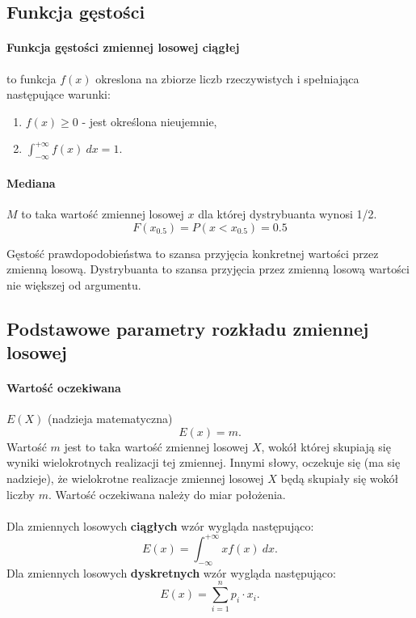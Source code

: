 \documentclass[]{report}
\begin{document}
\subsection{Funkcja gęstości}

\paragraph{Funkcja gęstości zmiennej losowej ciągłej} to funkcja $f(x)$ okreslona na zbiorze liczb rzeczywistych i spełniająca następujące warunki:

\begin{enumerate}
\item $f(x) \ge 0$ - jest określona nieujemnie,
\item $ \int_{-\infty}^{+ \infty} f(x)~dx = 1$.
\end{enumerate}

\paragraph{Mediana} $M$ to taka wartość zmiennej losowej $x$ dla której dystrybuanta wynosi 1/2.
\begin{equation}
F(x_{0.5}) = P(x < x_{0.5}) = 0.5
\end{equation}


Gęstość prawdopodobieństwa to szansa przyjęcia konkretnej wartości
przez zmienną losową. Dystrybuanta to szansa przyjęcia przez zmienną
losową wartości nie większej od argumentu.

\subsection{Podstawowe parametry rozkładu zmiennej losowej}
\paragraph{Wartość oczekiwana} $E(X)$ (nadzieja matematyczna)
\begin{equation}
E(x) = m.
\end{equation}
Wartość $m$ jest to taka wartość zmiennej losowej $X$, wokół której skupiają się
wyniki wielokrotnych realizacji tej zmiennej. Innymi słowy, oczekuje się (ma
się nadzieje), że wielokrotne realizacje zmiennej losowej $X$ będą skupiały się
wokół liczby $m$. Wartość oczekiwana należy do miar położenia. \\\\
Dla zmiennych losowych \textbf{ciągłych} wzór wygląda następująco:
\begin{equation}
E(x) = \int_{-\infty}^{+ \infty} xf(x)~dx.
\end{equation}
Dla zmiennych losowych \textbf{dyskretnych} wzór wygląda następująco:
\begin{equation}
E(x) = \sum_{i=1}^{n} p_i \cdot x_i.
\end{equation}
\medskip
\end{document}
